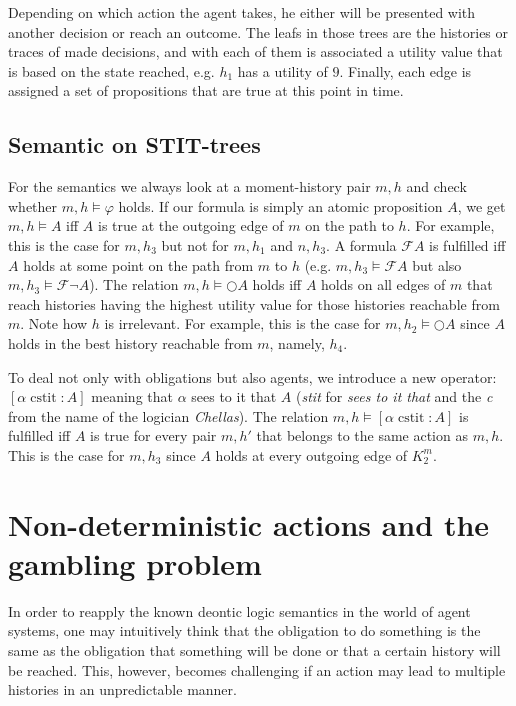 \documentclass{article}
\newcommand{\cstit}{\operatorname{cstit}}
\begin{document}
Depending on which action the agent takes, he either will be presented with another decision or reach an outcome. The leafs in those trees are the histories or traces of made decisions, and with each of them is associated a utility value that is based on the state reached, e.g. $h_1$ has a utility of $9$. Finally, each edge is assigned a set of propositions that are true at this point in time.

\subsection{Semantic on STIT-trees}
For the semantics we always look at a moment-history pair $m, h$ and check whether $m,h\models \varphi$ holds. If our formula is simply an atomic proposition $A$, we get $m,h\models A$ iff $A$ is true at the outgoing edge of $m$ on the path to $h$. For example, this is the case for $m,h_3$ but not for $m, h_1$ and $n,h_3$. A formula $\mathcal{F} A$ is fulfilled iff $A$ holds at some point on the path from $m$ to $h$ (e.g. $m,h_3\models \mathcal{F} A$ but also $m,h_3\models \mathcal{F} \neg A$). The relation $m,h\models \bigcirc A$ holds iff $A$ holds on all edges of $m$ that reach histories having the highest utility value for those histories reachable from $m$. Note how $h$ is irrelevant. For example, this is the case for $m,h_2\models \bigcirc A$ since $A$ holds in the best history reachable from $m$, namely, $h_4$. 

To deal not only with obligations but also agents, we introduce a new operator: $[\alpha \cstit \colon A]$ meaning that $\alpha$ sees to it that $A$ (\emph{stit} for \emph{sees to it that} and the \emph{c} from the name of the logician \emph{Chellas}). The relation $m,h\models [\alpha \cstit \colon A]$ is fulfilled iff $A$ is true for every pair $m, h'$ that belongs to the same action as $m,h$. This is the case for $m,h_3$ since $A$ holds at every outgoing edge of $K^m_2$.


\section{Non-deterministic actions and the gambling problem}
In order to reapply the known deontic logic semantics in the world of agent systems, one may intuitively think that the obligation to do something is the same as the obligation that something will be done or that a certain history will be reached. This, however, becomes challenging if an action may lead to multiple histories in an unpredictable manner. 
\end{document}
